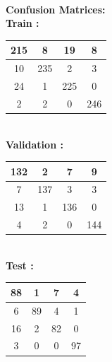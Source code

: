 \documentclass{article}
\begin{document}
\begin{flushleft}
\textbf{\\[5pt]Confusion Matrices: \\[10pt]}
\textbf{Train :\\[5pt]}
\begin{tabular}{|c|c|c|c|}\hline  215 & 8 & 19 & 8 \\ \hline 10 & 235 & 2& 3 \\ \hline 24 & 1 & 225& 0 \\ \hline 2 & 2 & 0& 246 \\ \hline \end{tabular}

\textbf{\\[10pt]Validation :\\[5pt]}

\begin{tabular}{|c|c|c|c|}\hline  132 & 2 & 7 & 9 \\ \hline 7 & 137 & 3& 3 \\ \hline 13 & 1 & 136& 0 \\ \hline 4 & 2 & 0& 144 \\ \hline \end{tabular}

\textbf{\\[10pt]Test :\\[5pt]}

\begin{tabular}{|c|c|c|c|}\hline  88 & 1 & 7 & 4 \\ \hline 6 & 89 & 4 & 1 \\ \hline 16 & 2 & 82& 0 \\ \hline 3 & 0 & 0& 97 \\ \hline \end{tabular}
\end{flushleft}
\end{document}
